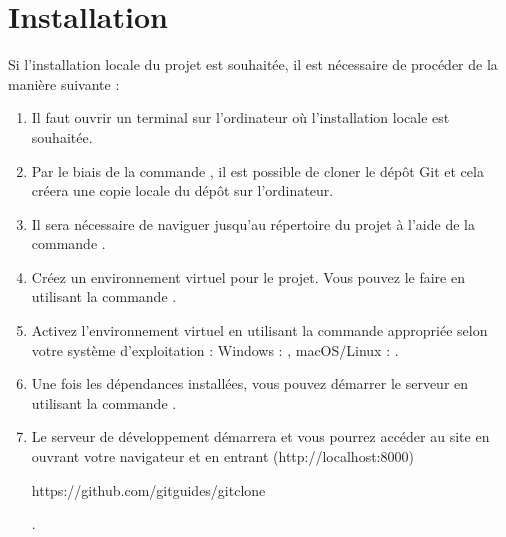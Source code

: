 \documentclass[a4,10pt,french]{sphinxmanual}
\begin{document}
\section{Installation}
\label{\detokenize{chapitre-02:installation}}
\sphinxAtStartPar
Si l’installation locale du projet est souhaitée, il est nécessaire de procéder de la manière suivante :
\begin{enumerate}
%
\item {} 
\sphinxAtStartPar
Il faut ouvrir un terminal sur l’ordinateur où l’installation locale est souhaitée.

\item {} 
\sphinxAtStartPar
Par le biais de la commande , il est possible de cloner le dépôt Git et cela créera une copie locale du dépôt sur l’ordinateur.

\item {} 
\sphinxAtStartPar
Il sera nécessaire de naviguer jusqu’au répertoire du projet à l’aide de la commande .

\item {} 
\sphinxAtStartPar
Créez un environnement virtuel pour le projet. Vous pouvez le faire en utilisant la commande .

\item {} 
\sphinxAtStartPar
Activez l’environnement virtuel en utilisant la commande appropriée selon votre système d’exploitation : Windows : , macOS/Linux : .

\item {} 
\sphinxAtStartPar
Une fois les dépendances installées, vous pouvez démarrer le serveur en utilisant la commande .

\item {} 
\sphinxAtStartPar
Le serveur de développement démarrera et vous pourrez accéder au site en ouvrant votre navigateur et en entrant  (http://localhost:8000) \sphinxstepexplicit %
\begin{footnote}[3]\label{\thesphinxscope.3}%
\sphinxAtStartFootnote
https://github.com/git\sphinxhyphen{}guides/git\sphinxhyphen{}clone
%
\end{footnote}.

\end{enumerate}
\end{document}
